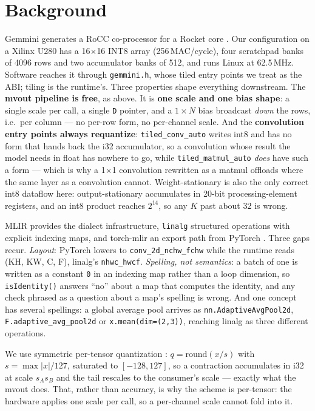 \documentclass[runningheads]{llncs}
\begin{document}
\section{Background}

Gemmini \cite{gemmini} generates a RoCC co-processor for a Rocket core
\cite{rocket}. Our configuration on a Xilinx U280 has a 16$\times$16 INT8 array
(256\,MAC/cycle), four scratchpad banks of 4096 rows and two accumulator banks of
512, and runs Linux at 62.5\,MHz. Software reaches it through \texttt{gemmini.h},
whose tiled entry points we treat as the ABI; tiling is the runtime's. Three
properties shape everything downstream. The
\textbf{mvout pipeline is free}, as above. It is \textbf{one scale and one bias
shape}: a single scale per call, a single \texttt{D} pointer, and a $1{\times}N$
bias broadcast \emph{down} the rows, i.e.\ per column --- no per-row form, no
per-channel scale. And the \textbf{convolution entry points always requantize}:
\texttt{tiled\_conv\_auto} writes int8 and has no form that hands back the i32
accumulator, so a convolution whose result the model needs in float has nowhere to
go, while \texttt{tiled\_matmul\_auto} \emph{does} have such a form --- which is
why a 1$\times$1 convolution rewritten as a matmul offloads where the same layer
as a convolution cannot. Weight-stationary is also the only correct int8
dataflow here: output-stationary accumulates in 20-bit processing-element
registers, and an int8 product reaches $2^{14}$, so any $K$ past about 32 is
wrong.

MLIR \cite{mlir} provides the dialect infrastructure, \texttt{linalg}
\cite{linalgcodegen} structured operations with explicit indexing maps, and
torch-mlir \cite{torchmlir} an export path from PyTorch \cite{pytorch}. Three gaps recur. \emph{Layout}: PyTorch lowers to \texttt{conv\_2d\_nchw\_fchw}
while the runtime reads (KH, KW, C, F), linalg's \texttt{nhwc\_hwcf}.
\emph{Spelling, not semantics}: a batch of one is written as a constant
\texttt{0} in an indexing map rather than a loop dimension, so
\texttt{isIdentity()} answers ``no'' about a map that computes the identity, and
any check phrased as a question about a map's spelling is wrong. And one concept has several spellings: a global average pool
arrives as \texttt{nn.AdaptiveAvgPool2d}, \texttt{F.adaptive\_avg\_pool2d} or
\texttt{x.mean(dim=(2,3))}, reaching linalg as three different operations.

We use symmetric per-tensor quantization \cite{jacob,krishnamoorthi}: $q =
\mathrm{round}(x/s)$ with $s = \max|x|/127$, saturated to $[-128,127]$, so a
contraction accumulates in i32 at scale $s_A s_B$ and the tail rescales to the
consumer's scale --- exactly what the mvout does. That, rather than accuracy, is
why the scheme is per-tensor: the hardware applies one scale per call, so a per-channel
scale cannot fold into it.
\end{document}
